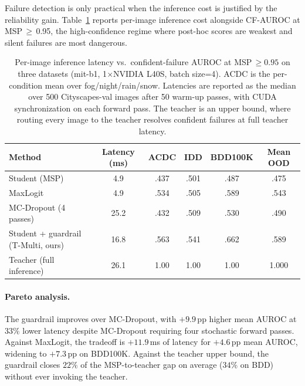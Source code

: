 \documentclass{article}
\begin{document}
Failure detection is only practical when the inference cost is justified by the reliability gain. Table~\ref{tab:latency-auroc} reports per-image inference cost alongside CF-AUROC at MSP$\,\geq\,$0.95, the high-confidence regime where post-hoc scores are weakest and silent failures are most dangerous.


\begin{table}[htpb]
 \centering
 \small
 \setlength{\tabcolsep}{6pt}
 \caption{Per-image inference latency vs.\ confident-failure AUROC at MSP$\,\geq 0.95$ on three datasets (mit-b1, 1$\times$NVIDIA L40S, batch size=4). ACDC is the per-condition mean over fog/night/rain/snow. Latencies are reported as the median over 500 Cityscapes-val images after 50 warm-up passes, with CUDA synchronization on each forward pass. The teacher is an upper bound, where routing every image to the teacher resolves confident failures at full teacher latency.}
 \label{tab:latency-auroc}
 \begin{tabular}{lccccc}
  \toprule
  Method & Latency (ms) & ACDC & IDD & BDD100K & Mean OOD \\
  \midrule
  Student (MSP)        & 4.9 & .437 & .501 & .487 & .475 \\
  MaxLogit           & 4.9 & .534 & .505 & .589 & .543 \\
  MC-Dropout (4 passes)    & 25.2 & .432 & .509 & .530 & .490 \\
  Student + guardrail (T-Multi, ours) & 16.8 & .563 & .541 & .662 & .589 \\
  Teacher (full inference)  & 26.1 & 1.00 & 1.00 & 1.00 & 1.000 \\
  \bottomrule
 \end{tabular}
\end{table}


\paragraph{Pareto analysis.} The guardrail improves over MC-Dropout, with $+9.9$\,pp higher mean AUROC at $33\%$ lower latency despite MC-Dropout requiring four stochastic forward passes. Against MaxLogit, the tradeoff is $+11.9$\,ms of latency for $+4.6$\,pp mean AUROC, widening to $+7.3$\,pp on BDD100K. Against the teacher upper bound, the guardrail closes $22\%$ of the MSP-to-teacher gap on average ($34\%$ on BDD) without ever invoking the teacher.
\end{document}

